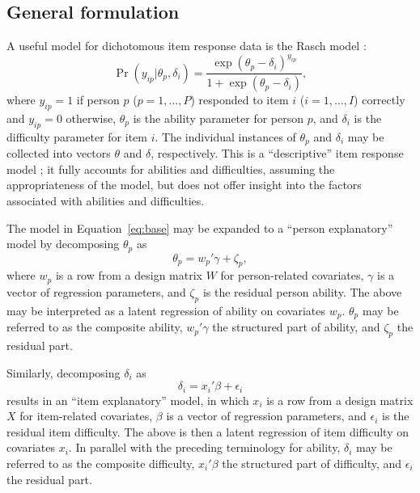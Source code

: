 \documentclass[12pt, letterpaper]{article}
\begin{document}
\subsection{General formulation}

A useful model for dichotomous item response data is the Rasch model \parencite{Rasch1960a}:
\begin{equation} \label{eq:base}
	\Pr ( y_{ip} | \theta_p, \delta_i) =
	\frac {\exp(\theta_p - \delta_i)^{y_{ip}}}
	{1 + \exp(\theta_p - \delta_i)}
,\end{equation}
where $y_{ip} = 1$ if person $p$ ($p = 1, \dotsc, P$) responded to item $i$ ($i = 1, \dotsc, I$) correctly and $y_{ip} = 0$ otherwise, $\theta_p$ is the ability parameter for person $p$, and $\delta_i$ is the difficulty parameter for item $i$. The individual instances of $\theta_p$ and $\delta_i$ may be collected into vectors $\theta$ and $\delta$, respectively. This is a ``descriptive'' item response model \parencite{Wilson2004}; it fully accounts for abilities and difficulties, assuming the appropriateness of the model, but does not offer insight into the factors associated with abilities and difficulties.

The model in Equation~\ref{eq:base} may be expanded to a ``person explanatory'' model by decomposing $\theta_p$ as
\begin{equation} \label{eq:theta}
	\theta_p = w_p' \gamma + \zeta_p
,\end{equation}
where $w_p$ is a row from a design matrix $W$ for person-related covariates, $\gamma$ is a vector of regression parameters, and $\zeta_p$ is the residual person ability. The above may be interpreted as a latent regression of ability on covariates $w_p$. $\theta_p$ may be referred to as the composite ability, $w_p' \gamma$ the structured part of ability, and $\zeta_p$ the residual part.

Similarly, decomposing $\delta_i$ as
\begin{equation} \label{eq:delta}
	\delta_i = x_i' \beta + \epsilon_i
\end{equation}
results in an ``item explanatory'' model, in which $x_i$ is a row from a design matrix $X$ for item-related covariates, $\beta$ is a vector of regression parameters, and $\epsilon_i$ is the residual item difficulty. The above is then a latent regression of item difficulty on covariates $x_i$. In parallel with the preceding terminology for ability, $\delta_i$ may be referred to as the composite difficulty, $x_i' \beta$ the structured part of difficulty, and $\epsilon_i$ the residual part.
\end{document}
